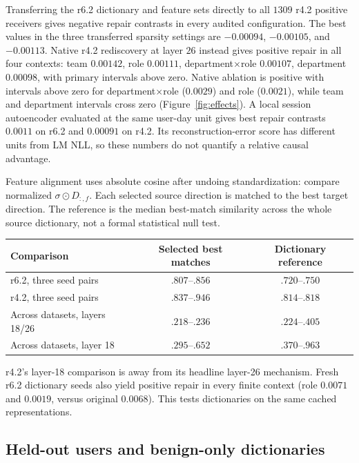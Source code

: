 Transferring the r6.2 dictionary and feature sets directly to all $1309$
r4.2 positive receivers gives negative repair contrasts in every audited
configuration. The best values in the three transferred sparsity settings
are $-0.00094$, $-0.00105$, and $-0.00113$.
Native r4.2 rediscovery at layer $26$ instead gives positive repair
in all four contexts: team $0.00142$, role $0.00111$,
department$\times$role $0.00107$, department $0.00098$, with primary
intervals above zero. Native ablation is positive with intervals above
zero for department$\times$role ($0.0029$) and role ($0.0021$),
while team and department intervals cross zero (Figure~\ref{fig:effects}).
A local session autoencoder evaluated at the same user-day unit gives
best repair contrasts $0.0011$ on r6.2 and $0.00091$ on r4.2.
Its reconstruction-error score has different units from LM NLL, so
these numbers do not quantify a relative causal advantage.

Feature alignment uses absolute cosine after undoing standardization:
compare normalized $\sigma\odot D_{:,f}$. Each selected source direction
is matched to the best target direction. The reference is the median
best-match similarity across the whole source dictionary, not a formal
statistical null test.
\begin{center}\small
\begin{tabular}{lcc}
\toprule
Comparison & Selected best matches & Dictionary reference \\
\midrule
r6.2, three seed pairs & $.807$--$.856$ & $.720$--$.750$ \\
r4.2, three seed pairs & $.837$--$.946$ & $.814$--$.818$ \\
Across datasets, layers 18/26 & $.218$--$.236$ & $.224$--$.405$ \\
Across datasets, layer 18 & $.295$--$.652$ & $.370$--$.963$ \\
\bottomrule
\end{tabular}\end{center}
r4.2's layer-18 comparison is away from its headline layer-26 mechanism.
Fresh r6.2 dictionary seeds also yield positive repair in every finite
context (role $0.0071$ and $0.0019$, versus original $0.0068$).
This tests dictionaries on the same cached representations.

\subsection{Held-out users and benign-only dictionaries}

